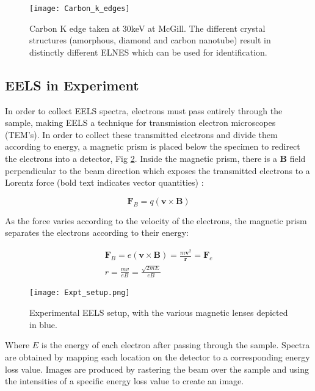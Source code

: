 \begin{figure}
	\centering
	\texttt{[image: Carbon\_k\_edges]}
	\caption{Carbon K edge taken at 30keV at McGill. The different crystal structures (amorphous, diamond and carbon nanotube) result in distinctly different ELNES which can be used for identification.   }
	\label{carbon-k-edge}
\end{figure}


\subsection{EELS in Experiment}

In order to collect EELS spectra, electrons must pass entirely through the sample, making EELS a technique for transmission electron microscopes (TEM's)\cite{Egerton}. In order to collect these transmitted electrons and divide them according to energy, a magnetic prism is placed below the specimen to redirect the electrons into a detector,  Fig \ref{prism}.  Inside the magnetic prism, there is a $\mathrm{\textbf{B}}$ field perpendicular to the beam direction which exposes the transmitted electrons to a Lorentz force (bold text indicates vector quantities) \cite{griffiths_em}: 


\begin{equation}
	\textbf{F}_B = q (\textbf{v} \times \textbf{B})
\end{equation}

As the force varies according to the velocity of the electrons, the magnetic prism  separates the electrons according to their energy: 

\begin{gather}
\textbf{F}_B = e (\textbf{v} \times \textbf{B}) =  \frac{m \textbf{v}^2}{\textbf{r}} = \textbf{F}_c \\
 r =  \frac{mv}{eB} = \frac{\sqrt{2mE}}{eB}
\end{gather}

\begin{figure}
 \centering
 \texttt{[image: Expt\_setup.png]}
 \caption{Experimental EELS setup, with the various magnetic lenses depicted in blue.  }
 \label{prism}
 
\end{figure}

Where  $E$ is the energy of each electron after passing through the sample.  Spectra are obtained by mapping each location on the detector to a corresponding energy loss value. Images are produced by  rastering the beam over the sample and using the intensities of a specific energy loss value to create an image.\\ 

